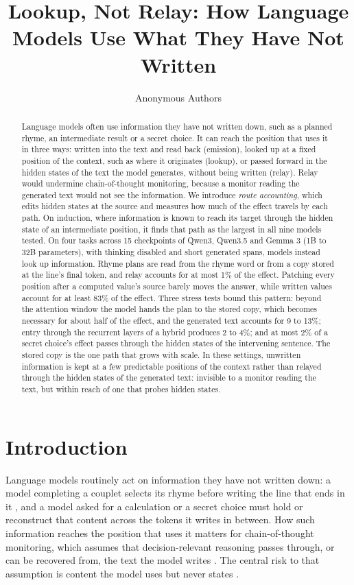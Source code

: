 \documentclass[
]{article}
\title{Lookup, Not Relay: How Language Models Use What They Have Not
Written}
\author{Anonymous Authors}
\date{}
\begin{document}
\maketitle
\begin{abstract}
Language models often use information they have not written down, such
as a planned rhyme, an intermediate result or a secret choice. It can
reach the position that uses it in three ways: written into the text and
read back (emission), looked up at a fixed position of the context, such
as where it originates (lookup), or passed forward in the hidden states
of the text the model generates, without being written (relay). Relay
would undermine chain-of-thought monitoring, because a monitor reading
the generated text would not see the information. We introduce
\emph{route accounting}, which edits hidden states at the source and
measures how much of the effect travels by each path. On induction,
where information is known to reach its target through the hidden state
of an intermediate position, it finds that path as the largest in all
nine models tested. On four tasks across 15 checkpoints of Qwen3,
Qwen3.5 and Gemma 3 (1B to 32B parameters), with thinking disabled and
short generated spans, models instead look up information. Rhyme plans
are read from the rhyme word or from a copy stored at the line's final
token, and relay accounts for at most 1\% of the effect. Patching every
position after a computed value's source barely moves the answer, while
written values account for at least 83\% of the effect. Three stress
tests bound this pattern: beyond the attention window the model hands
the plan to the stored copy, which becomes necessary for about half of
the effect, and the generated text accounts for 9 to 13\%; entry through
the recurrent layers of a hybrid produces 2 to 4\%; and at most 2\% of a
secret choice's effect passes through the hidden states of the
intervening sentence. The stored copy is the one path that grows with
scale. In these settings, unwritten information is kept at a few
predictable positions of the context rather than relayed through the
hidden states of the generated text: invisible to a monitor reading the
text, but within reach of one that probes hidden states.
\end{abstract}


\section{Introduction}\label{sec-intro}

Language models routinely act on information they have not written down:
a model completing a couplet selects its rhyme before writing the line
that ends in it \citep{lindsey2025biology, hanna2026latent}, and a model
asked for a calculation or a secret choice must hold or reconstruct that
content across the tokens it writes in between. How such information
reaches the position that uses it matters for chain-of-thought
monitoring, which assumes that decision-relevant reasoning passes
through, or can be recovered from, the text the model writes
\citep{korbak2025monitorability, baker2025monitoring}. The central risk
to that assumption is content the model uses but never states
\citep{pfau2024dots, roger2023steganography, turpin2023unfaithful, chen2025reasoning}.
\end{document}
